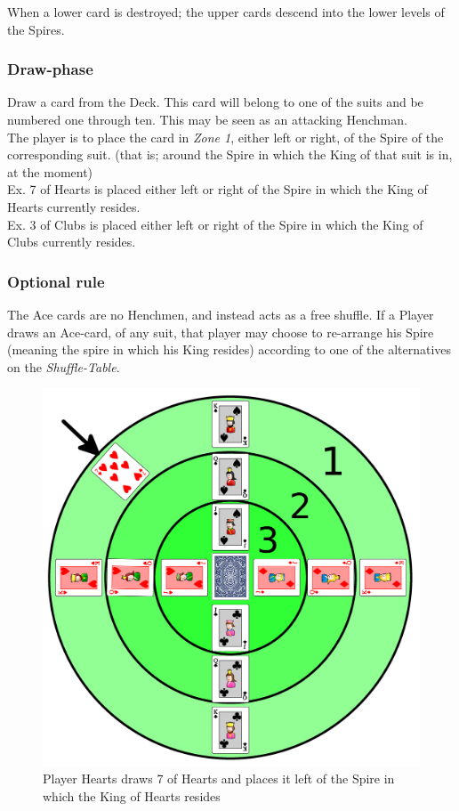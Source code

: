 \documentclass[11pt,twocolumn]{article}
\begin{document}
\noindent
When a lower card is destroyed; the upper cards descend into the lower levels of the Spires.

\subsubsection{Draw-phase}
Draw a card from the Deck. This card will belong to one of the suits and be numbered one through ten. This may be seen as an attacking Henchman. \\
The player is to place the card in \textit{Zone 1}, either left or right, of the Spire of the corresponding suit. (that is; around the Spire in which the King of that suit is in, at the moment) \\
Ex. 7 of Hearts is placed either left or right of the Spire in which the King of Hearts currently resides. \\
Ex. 3 of Clubs is placed either left or right of the Spire in which the King of Clubs currently resides.

\subsubsection{Optional rule}
The Ace cards are no Henchmen, and instead acts as a free shuffle. If a Player draws an Ace-card, of any suit, that player may choose to re-arrange his Spire (meaning the spire in which his King resides) according to one of the alternatives on the \textit{Shuffle-Table}.

\begin{figure}[h!]
\centering
\includegraphics[scale=0.08]{draw.png}
\caption{Player Hearts draws 7 of Hearts and places it left of the Spire in which the King of Hearts resides}
\label{starting}
\end{figure}
\end{document}
